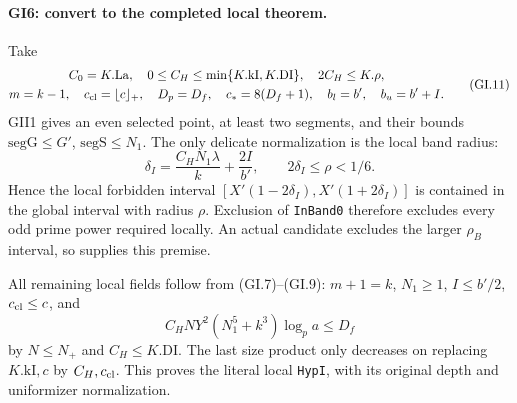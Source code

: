 \documentclass[11pt,a4paper]{article}
\numberwithin{equation}{section}
\theoremstyle{remark}\newtheorem{remark}[theorem]{Remark}
\begin{document}
\paragraph{GI6: convert to the completed local theorem.}
Take
\[
\begin{gathered}
 C_0=K.\mathrm{La},\quad
 0\le C_H\le\min\{K.\mathrm{kI},K.\mathrm{DI}\},\quad
 2C_H\le K.\rho,\\
 m=k-1,\quad c_{\rm cl}=\lfloor c\rfloor_+,\quad
 D_p=D_f,\quad c_*=8(D_f+1),\quad
 b_l=b',\quad b_u=b'+I.
\end{gathered}                                                    \tag{GI.11}
\]
GII1 gives an even selected point, at least two segments, and
their bounds $\mathrm{segG}\le G'$, $\mathrm{segS}\le N_1$.
The only delicate normalization is the local band radius:
\[
 \delta_I=\frac{C_HN_1\lambda}k+\frac{2I}{b'},\qquad
 2\delta_I\le\rho<1/6.                                  \tag{GI.12}
\]
Hence the local forbidden interval
$[X'(1-2\delta_I),X'(1+2\delta_I)]$ is contained in the
global interval with radius $\rho$. Exclusion of
\texttt{InBand0} therefore excludes every odd prime power
required locally. An actual candidate excludes the larger
$\rho_B$ interval, so supplies this premise.

All remaining local fields follow from (GI.7)--(GI.9):
$m+1=k$, $N_1\ge1$, $I\le b'/2$, $c_{\rm cl}\le c$,
and
\[
 C_HNY^2(N_1^5+k^3)\log_p a\le D_f
\]
by $N\le N_+$ and $C_H\le K.\mathrm{DI}$.
The last size product only decreases on replacing
$K.\mathrm{kI},c$ by $C_H,c_{\rm cl}$. This proves the
literal local \texttt{HypI}, with its original depth and
uniformizer normalization.
\end{document}
